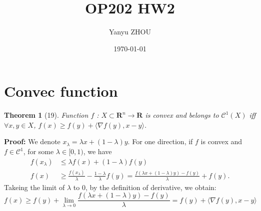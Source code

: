 \documentclass[12pt]{article}
\title{OP202 HW2}
\author{Yanyu ZHOU}
\date{\today}
\theoremstyle{mystyle}
\newtheorem{theorem}{Theorem}
\begin{document}
\maketitle
\section{Convec function}
\begin{theorem}[19]
\label{19}
    Function $f$ : $X \subset \mathbf{R}^n \rightarrow \mathbf{R}$ is convex and belongs to $\mathcal{C}^1(X)$ iff 
    $\forall x,y \in X$, $f(x) \geq f(y) + \langle \nabla f(y), x - y \rangle$.
\end{theorem}

\textbf{Proof:} 
We denote $x_\lambda = \lambda x + (1-\lambda)y$.
For one direction, if $f$ is convex and $f \in \mathcal{C}^1$, for some $\lambda \in [0,1)$, we have
\begin{equation*}
\begin{split}
    f(x_\lambda) &\leq \lambda f(x) + (1-\lambda) f(y)\\
    f(x) &\geq \frac{f(x_\lambda)}{\lambda} - \frac{1-\lambda}{\lambda}f(y) = \frac{f(\lambda x + (1-\lambda)y)-f(y)}{\lambda} + f(y).
\end{split}
\end{equation*}
Takeing the limit of $\lambda$ to 0, by the definition of derivative, we obtain:
$$f(x) \geq f(y) + \lim\limits_{\lambda \rightarrow 0} \frac{f(\lambda x + (1-\lambda)y)-f(y)}{\lambda} = f(y) + \langle \nabla f(y), x-y \rangle$$
\end{document}
